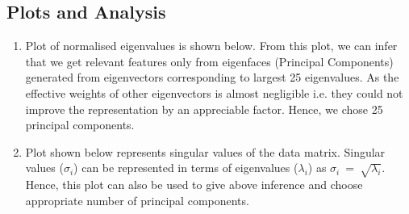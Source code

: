 \documentclass[11pt,letterpaper]{article}
\begin{document}
\subsection*{Plots and Analysis}
\begin{enumerate}
    \item  Plot of normalised eigenvalues is shown below. From this plot, we can infer that we get relevant features only from eigenfaces (Principal Components) generated from eigenvectors corresponding to largest 25 eigenvalues. As the effective weights of other eigenvectors is almost negligible i.e. they could not improve the representation by an appreciable factor. Hence, we chose 25 principal components.
    \item  Plot shown below represents singular values of the data matrix. Singular values ($\sigma_i$) can be represented in terms of eigenvalues ($\lambda_i$) as $\sigma_i \ = \ \sqrt{\lambda_i}$. Hence, this plot can also be used to give above inference and choose appropriate number of principal components.
\end{enumerate}
\begin{figure}[htbp]
    \centering
     \\
     \\
\end{figure}
\end{document}
